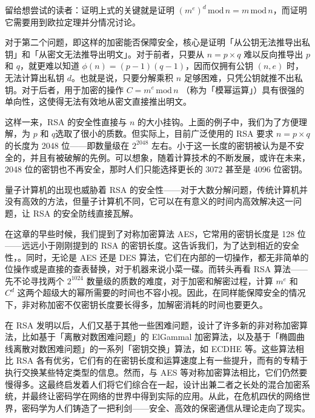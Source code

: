\begin{note}
  留给想尝试的读者：证明上式的关键就是证明 $(m^e)^d\,\mathrm{mod}\,n=m\,\mathrm{mod}\,n$，而证明它需要用到欧拉定理并分情况讨论。
\end{note}

对于第二个问题，即这样的加密能否保障安全，核心是证明「从公钥无法推导出私钥」和「从密文无法推导出明文」。对于前者，只要从 $n=p\times q$ 难以反向推导出 $p$ 和 $q$，就更难以知道 $\phi(n)=(p-1)(q-1)$，因而仅拥有公钥 $(n, e)$ 时，无法计算出私钥 $d$。也就是说，只要分解乘积 $n$ 足够困难，只凭公钥就推不出私钥。对于后者，用于加密的操作 $C= m^e\,\mathrm{mod}\,n$ （称为「模幂运算」）具有很强的单向性，这使得无法有效地从密文直接推出明文。

这样一来，RSA 的安全性直接与 $n$ 的大小挂钩。上面的例子中，我们为了方便理解，为 $p$ 和 $q$选取了很小的质数。但实际上，目前广泛使用的 RSA 要求 $n=p\times q$ 的长度为 2048 位——即数量级在 $2^{2048}$ 左右。小于这一长度的密钥被认为是不安全的，并且有被破解的先例。可以想象，随着计算技术的不断发展，或许在未来，2048 位的密钥也不再安全，那时人们只能选择更长的 3072 甚至是 4096 位密钥。

\begin{note}
  量子计算机的出现也威胁着 RSA 的安全性——对于大数分解问题，传统计算机并没有高效的方法，但量子计算机不同，它可以在有意义的时间内高效解决这一问题，让 RSA 的安全防线直接瓦解。
\end{note}

在这章的早些时候，我们提到了对称加密算法 AES，它常用的密钥长度是 128 位——远远小于刚刚提到的 RSA 的密钥长度。这告诉我们，为了达到相近的安全性，。同时，无论是 AES 还是 DES 算法，它们在内部的一切操作，都无非简单的位操作或是直接的查表替换，对于机器来说小菜一碟。而转头再看 RSA 算法——先不论寻找两个 $2^{1024}$ 数量级的质数的难度，对于加密和解密过程，计算 $m^e$ 和 $C^d$ 这两个超级大的幂所需要的时间也不容小视。因此，在同样能保障安全的情况下，非对称加密不仅密钥长度要长得多，加解密消耗的时间也要更久。

在 RSA 发明以后，人们又基于其他一些困难问题，设计了许多新的非对称加密算法，比如基于「离散对数困难问题」的 ElGammal 加密算法，以及基于「椭圆曲线离散对数困难问题」的一系列「密钥交换」算法，如 ECDHE 等。这些算法相比 RSA 各有优劣，它们有的在密钥长度和运算速度上有一些提升，而有的专精于执行交换某些特定类型的信息。然而，与 AES 等对称加密算法相比，它们仍然要慢得多。这最终启发着人们将它们综合在一起，设计出兼二者之长处的混合加密系统，并最终让密码学在网络的世界中得到实际的应用。从此，在危机四伏的网络世界，密码学为人们铸造了一把利剑——安全、高效的保密通信从理论走向了现实。

